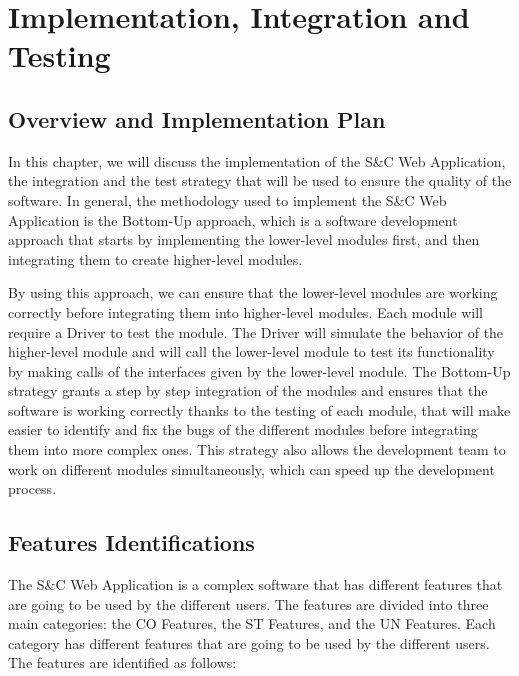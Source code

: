 \chapter{Implementation, Integration and Testing}
\label{ch:implementation-integration-and-testing}%

\section{Overview and Implementation Plan}
\label{sec:overview-and-implementation-plan}%

\par In this chapter, we will discuss the implementation of the S\&C Web Application, the integration and the test
strategy that will be used to ensure the quality of the software. In general, the methodology used to implement the
S\&C Web Application is the Bottom-Up approach, which is a software development approach that starts by implementing
the lower-level modules first, and then integrating them to create higher-level modules.

\par By using this approach, we can ensure that the lower-level modules are working correctly before integrating them into
higher-level modules. Each module will require a Driver to test the module. The Driver will simulate the behavior of
the higher-level module and will call the lower-level module to test its functionality by making calls of the interfaces
given by the lower-level module.
The Bottom-Up strategy grants a step by step integration of the modules and ensures that the software is working correctly
thanks to the testing of each module, that will make easier to identify and fix the bugs of the different modules before
integrating them into more complex ones. This strategy also allows the development team to work on different modules
simultaneously, which can speed up the development process.


\section{Features Identifications}
\label{sec:features-identifications}%

\par The S\&C Web Application is a complex software that has different features that are going to be used by the different
users. The features are divided into three main categories: the CO Features, the ST Features, and the UN Features. Each
category has different features that are going to be used by the different users. The features are identified as follows:

